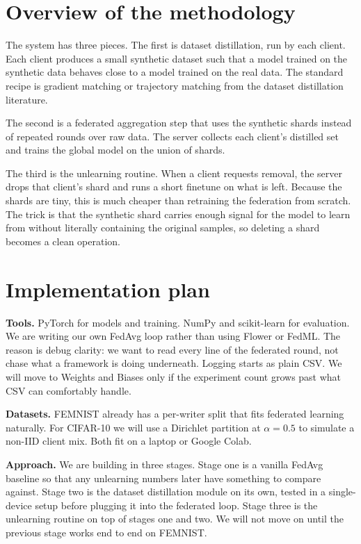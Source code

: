 \documentclass[11pt,a4paper]{article}
\begin{document}
\section*{Overview of the methodology}

The system has three pieces. The first is dataset distillation, run by each client. Each client produces a small synthetic dataset such that a model trained on the synthetic data behaves close to a model trained on the real data. The standard recipe is gradient matching or trajectory matching from the dataset distillation literature.

The second is a federated aggregation step that uses the synthetic shards instead of repeated rounds over raw data. The server collects each client's distilled set and trains the global model on the union of shards.

The third is the unlearning routine. When a client requests removal, the server drops that client's shard and runs a short finetune on what is left. Because the shards are tiny, this is much cheaper than retraining the federation from scratch. The trick is that the synthetic shard carries enough signal for the model to learn from without literally containing the original samples, so deleting a shard becomes a clean operation.

\section*{Implementation plan}

\textbf{Tools.} PyTorch for models and training. NumPy and scikit-learn for evaluation. We are writing our own FedAvg loop rather than using Flower or FedML. The reason is debug clarity: we want to read every line of the federated round, not chase what a framework is doing underneath. Logging starts as plain CSV. We will move to Weights and Biases only if the experiment count grows past what CSV can comfortably handle.

\textbf{Datasets.} FEMNIST already has a per-writer split that fits federated learning naturally. For CIFAR-10 we will use a Dirichlet partition at $\alpha = 0.5$ to simulate a non-IID client mix. Both fit on a laptop or Google Colab.

\textbf{Approach.} We are building in three stages. Stage one is a vanilla FedAvg baseline so that any unlearning numbers later have something to compare against. Stage two is the dataset distillation module on its own, tested in a single-device setup before plugging it into the federated loop. Stage three is the unlearning routine on top of stages one and two. We will not move on until the previous stage works end to end on FEMNIST.
\end{document}
